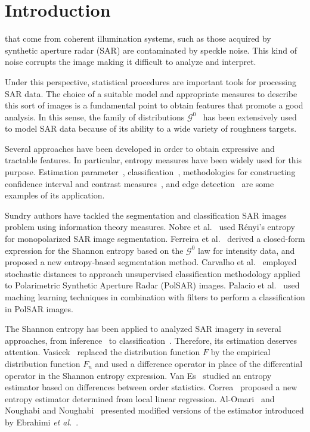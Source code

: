 \documentclass[journal]{IEEEtran}
\begin{document}
	\IEEEpeerreviewmaketitle
	
	\section{Introduction}
	\label{intro}
	 that come from coherent illumination systems, such as those acquired by synthetic aperture radar (SAR) are contaminated by speckle noise. 
	This kind of noise corrupts the image making it difficult to analyze and interpret. 
	
	Under this perspective, statistical procedures are important tools for processing SAR data. 
	The choice of a suitable model and appropriate measures to describe this sort of images is a fundamental point to obtain features that promote a good analysis. In this sense, the family of distributions $\mathcal{G}^0$~\cite{Frery97} has been extensively used to model SAR data because of its ability to a wide variety of roughness targets. 
    
	Several approaches have been developed in order to obtain expressive and tractable features. 
	In particular, entropy measures have been widely used for this purpose. 
	Estimation parameter~\cite{gambini2015}, classification~\cite{Carvalho2019}, methodologies for constructing
	confidence interval and contrast measures~\cite{Frery2012,Nascimento2009}, and edge detection~\cite{Nascimento2014} are some examples of its application.
	
	Sundry authors have tackled the segmentation and classification SAR images problem using information theory measures. 
	Nobre et al.~\cite{Nobre2016} used Rényi's entropy for monopolarized SAR image segmentation.
	Ferreira et al.~\cite{Ferreira2020} derived a closed-form expression for the Shannon entropy based on the $\mathcal{G}^0$ law for intensity data, and proposed a new entropy-based segmentation method. 
	Carvalho et al.~\cite{Carvalho2019} employed stochastic distances to approach unsupervised classification methodology applied to Polarimetric Synthetic Aperture Radar (PolSAR) images. Palacio et al.~\cite{Palacio2019} used maching learning techniques in combination with filters to perform a classification in PolSAR images.
	
	The Shannon entropy has been applied to analyzed SAR imagery in several approaches, from inference~\cite{Frery2012} to classification~\cite{Ferreira2020}. 
	Therefore, its estimation deserves attention. 
	Vasicek~\cite{Vasicek76} replaced the distribution function $F$ by the empirical distribution function $F_n$ and used a difference operator in place of the differential operator in the Shannon entropy expression. 
	Van Es~\cite{VanEs92} studied an entropy estimator based on differences between order statistics. 
	Correa~\cite{Correa95} proposed a new entropy estimator determined from local linear regression.
	Al-Omari~\cite{AlOmari2016} and Noughabi and Noughabi~\cite{Noughabi13} presented modified versions of the estimator introduced by Ebrahimi \emph{et al.}~\cite{Ebrahimi94}.
	
\end{document}
